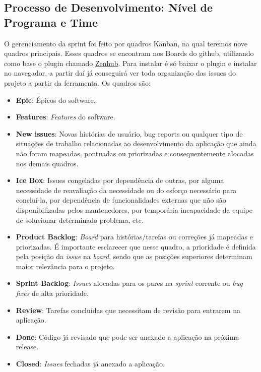 \subsection{Processo de Desenvolvimento: Nível de Programa e Time}

O gerenciamento da sprint foi feito por quadros Kanban, na qual teremos nove quadros principais. Esses quadros se encontram nos Boards do github, utilizando como base o plugin chamado \href{https://www.zenhub.com/}{Zenhub}. Para instalar é só baixar o plugin e instalar no navegador, a partir daí já conseguirá ver toda organização das issues do projeto a partir da ferramenta. Os quadros são:

\begin{itemize}
  \item \textbf{Epic}: Épicos do software.
  \item \textbf{Features}: \textit{Features} do software.
  \item \textbf{New issues}: Novas histórias de usuário, bug reports ou qualquer tipo de situações de trabalho relacionadas ao desenvolvimento da aplicação que ainda não foram mapeadas, pontuadas ou priorizadas e consequentemente alocadas nos demais quadros.
  \item \textbf{Ice Box}: Issues congeladas por dependência de outras, por alguma necessidade de reavaliação da necessidade ou do esforço necessário para concluí-la, por dependência de funcionalidades externas que não são disponibilizadas pelos mantenedores, por temporária incapacidade da equipe de solucionar determinado problema, etc.
  \item \textbf{Product Backlog}: \textit{Board} para histórias/tarefas ou correções já mapeadas e priorizadas. É importante esclarecer que nesse quadro, a prioridade é definida pela posição da \textit{issue} na \textit{board}, sendo que as posições superiores determinam maior relevância para o projeto.
  \item \textbf{Sprint Backlog}: \textit{Issues} alocadas para os pares na \textit{sprint} corrente ou \textit{bug fixes} de alta prioridade.
  \item \textbf{Review}: Tarefas concluídas que necessitam de revisão para entrarem na aplicação.
  \item \textbf{Done}: Código já revisado que pode ser anexado a aplicação na próxima release.
  \item \textbf{Closed}: \textit{Issues} fechadas já anexado a aplicação.
\end{itemize}


